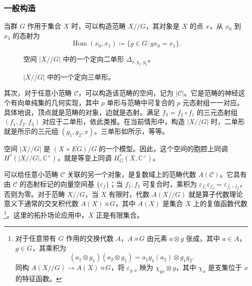 \subsubsection{一般构造}\label{sec:2.6.3.1}

当群 $G$ 作用于集合 $X$ 时，可以构造范畴 $X//G$，其对象是 $X$ 的点 $x$，从 $x_0$ 到 $x_1$ 的态射为
\begin{equation}\label{eq:2.87}
\operatorname{Hom}(x_0,x_1)\coloneqq\{g\in G:gx_0=x_1\}.
\end{equation}

\begin{figure}[H]
\centering
{}
\caption{空间 $|X//G|$ 中的一个定向二单形 $\Delta_{x,g_1,g_2}$。}\label{fig:2.21}
\end{figure}

\begin{figure}[H]
\centering
{}
\caption{$|X//G|$ 中的一个定向三单形。}\label{fig:2.22}
\end{figure}

其次，对于任意小范畴 $\mathcal{C}$，可以构造该范畴的空间，记为 $|\mathcal{C}|$。它是范畴的神经这个有向单纯集的几何实现，其中 $p$ 单形与范畴中可复合的 $p$ 元态射组一一对应。具体地说，顶点就是范畴的对象，边就是态射。满足 $f_3=f_2\circ f_1$ 的三元态射组 $(f_1,f_2,f_3)$ 对应于二单形，依此类推。在当前情形中，构造 $|X//G|$ 时，二单形就是所示的三元组 $(g_1,g_2,x)$。三单形如所示，等等。

空间 $|X//G|$ 是 $(X\times EG)/G$ 的一个模型。因此，这个空间的胞腔上同调 $H^*(|X//G|,\mathbb{C}^{\times})$，就是等变上同调 $H_G^*(X,\mathbb{C}^{\times})$。

可以给任意小范畴 $\mathcal{C}$ 关联的另一个对象，是复数域上的范畴代数 $A(\mathcal{C})$。它具有由 $\mathcal{C}$ 的态射标记的向量空间基 $\{\varepsilon_f\}$；当 $f_1,f_2$ 可复合时，乘积为 $\varepsilon_{f_1}\varepsilon_{f_2}=\varepsilon_{f_1\circ f_2}$，否则为零。对于范畴 $X//G$，当 $X$ 有限时，代数 $A(X//G)$ 就是算子代数理论意义下通常的交叉积代数 $A(X)\rtimes G$，其中 $A(X)$ 是集合 $X$ 上的复值函数代数\footnote{对于任意带有 $G$ 作用的交换代数 $A$，$A\rtimes G$ 由元素 $a\otimes g$ 张成，其中 $a\in A$，$g\in G$，其乘积为
\begin{equation}\label{eq:2.88}
(a_1\otimes g_1)(a_2\otimes g_2)=a_1g_1(a_2)\otimes g_1g_2.
\end{equation}
同构 $A(X//G)\to A(X)\rtimes G$，将 $\varepsilon_{g,x}$ 映为 $\chi_{gx}\otimes g$，其中 $\chi_x$ 是支集位于 $x$ 的特征函数。}。这里的拓扑场论应用中，$X$ 正是有限集合。

